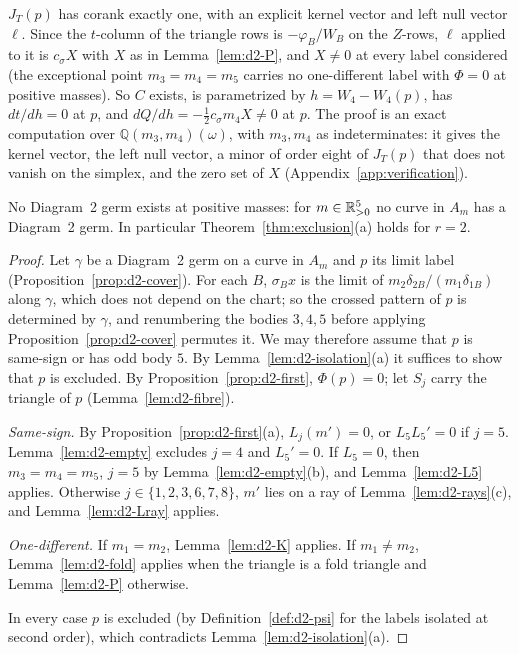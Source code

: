 $J_T(p)$ has corank exactly one, with an explicit kernel vector and left null vector $\ell$.
Since the $t$-column of the triangle rows is $-\varphi_B/W_B$ on the $Z$-rows, $\ell$ applied to it
is $c_\sigma X$ with $X$ as in Lemma~\ref{lem:d2-P}, and $X\ne0$ at every label considered (the
exceptional point $m_3=m_4=m_5$ carries no one-different label with $\Phi=0$ at positive masses).
So $C$ exists, is parametrized by $h=W_4-W_4(p)$, has $dt/dh=0$ at $p$, and
$dQ/dh=-\frac12c_\sigma m_4X\ne0$ at $p$.
The proof is an exact computation over $\mathbb Q(m_3,m_4)(\omega)$, with $m_3,m_4$ as
indeterminates: it gives the kernel vector, the left null vector, a minor of order eight of
$J_T(p)$ that does not vanish on the simplex, and the zero set of $X$
(Appendix~\ref{app:verification}).

\begin{theorem}\label{thm:d2}
No Diagram~2 germ exists at positive masses: for $m\in\mathbb{R}_{>0}^5$ no curve in $A_m$ has a Diagram~2
germ.  In particular Theorem~\ref{thm:exclusion}\textup{(a)} holds for $r=2$.
\end{theorem}

\begin{proof}
Let $\gamma$ be a Diagram~2 germ on a curve in $A_m$ and $p$ its limit label
(Proposition~\ref{prop:d2-cover}).  For each $B$, $\sigma_Bx$ is the limit of
$m_2\delta_{2B}/(m_1\delta_{1B})$ along $\gamma$, which does not depend on the chart; so the
crossed pattern of $p$ is determined by $\gamma$, and renumbering the bodies $3,4,5$ before
applying Proposition~\ref{prop:d2-cover} permutes it.  We may therefore assume that $p$ is
same-sign or has odd body $5$.
By Lemma~\ref{lem:d2-isolation}(a) it suffices to show that $p$ is excluded.  By
Proposition~\ref{prop:d2-first}, $\Phi(p)=0$; let $S_j$ carry the triangle of $p$
(Lemma~\ref{lem:d2-fibre}).

\emph{Same-sign.}  By Proposition~\ref{prop:d2-first}(a), $L_j(m')=0$, or $L_5L_5'=0$ if
$j=5$.  Lemma~\ref{lem:d2-empty} excludes $j=4$ and $L_5'=0$.  If $L_5=0$, then $m_3=m_4=m_5$,
$j=5$ by Lemma~\ref{lem:d2-empty}(b), and Lemma~\ref{lem:d2-L5} applies.  Otherwise
$j\in\{1,2,3,6,7,8\}$, $m'$ lies on a ray of Lemma~\ref{lem:d2-rays}(c), and
Lemma~\ref{lem:d2-Lray} applies.

\emph{One-different.}  If $m_1=m_2$, Lemma~\ref{lem:d2-K} applies.  If $m_1\ne m_2$,
Lemma~\ref{lem:d2-fold} applies when the triangle is a fold triangle and Lemma~\ref{lem:d2-P}
otherwise.

In every case $p$ is excluded (by Definition~\ref{def:d2-psi} for the labels isolated at second
order), which contradicts Lemma~\ref{lem:d2-isolation}(a).
\end{proof}

